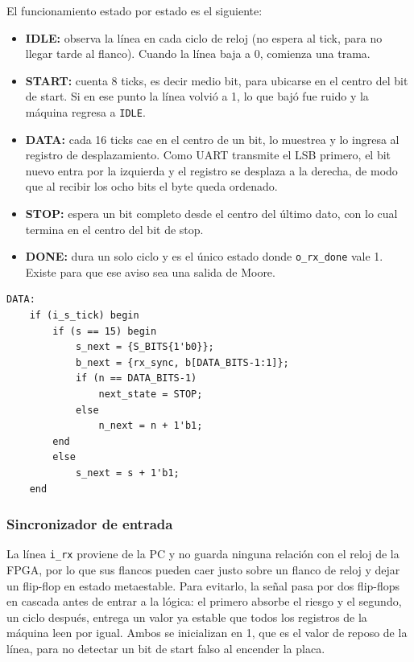 \documentclass[12pt,a4paper]{article}
\begin{document}
El funcionamiento estado por estado es el siguiente:

\begin{itemize}[nosep]
  \item \textbf{IDLE:} observa la línea en cada ciclo de reloj (no espera al
        tick, para no llegar tarde al flanco). Cuando la línea baja a 0,
        comienza una trama.
  \item \textbf{START:} cuenta 8 ticks, es decir medio bit, para ubicarse en el
        centro del bit de start. Si en ese punto la línea volvió a 1, lo que
        bajó fue ruido y la máquina regresa a \texttt{IDLE}.
  \item \textbf{DATA:} cada 16 ticks cae en el centro de un bit, lo muestrea y
        lo ingresa al registro de desplazamiento. Como UART transmite el LSB
        primero, el bit nuevo entra por la izquierda y el registro se desplaza a
        la derecha, de modo que al recibir los ocho bits el byte queda ordenado.
  \item \textbf{STOP:} espera un bit completo desde el centro del último dato,
        con lo cual termina en el centro del bit de stop.
  \item \textbf{DONE:} dura un solo ciclo y es el único estado donde
        \texttt{o\_rx\_done} vale 1. Existe para que ese aviso sea una salida de
        Moore.
\end{itemize}

\begin{lstlisting}[caption={Estado DATA del receptor.}]
DATA:
    if (i_s_tick) begin
        if (s == 15) begin
            s_next = {S_BITS{1'b0}};
            b_next = {rx_sync, b[DATA_BITS-1:1]};
            if (n == DATA_BITS-1)
                next_state = STOP;
            else
                n_next = n + 1'b1;
        end
        else
            s_next = s + 1'b1;
    end
\end{lstlisting}

\subsubsection{Sincronizador de entrada}

La línea \texttt{i\_rx} proviene de la PC y no guarda ninguna relación con el
reloj de la FPGA, por lo que sus flancos pueden caer justo sobre un flanco de
reloj y dejar un flip-flop en estado metaestable. Para evitarlo, la señal pasa
por dos flip-flops en cascada antes de entrar a la lógica: el primero absorbe el
riesgo y el segundo, un ciclo después, entrega un valor ya estable que todos los
registros de la máquina leen por igual. Ambos se inicializan en 1, que es el
valor de reposo de la línea, para no detectar un bit de start falso al encender
la placa.
\end{document}
